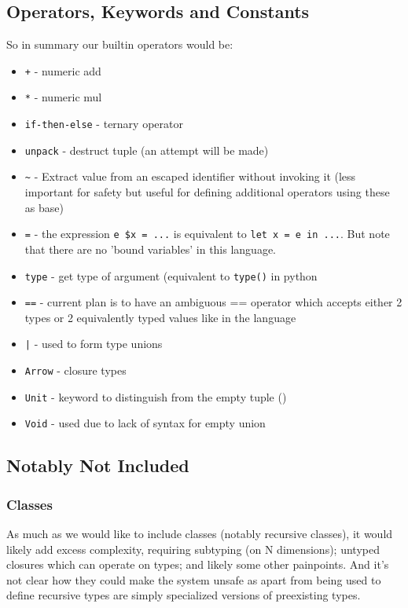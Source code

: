 \documentclass{article}
\begin{document}
\subsection{Operators, Keywords and Constants}
So in summary our builtin operators would be: 
\begin{itemize}
    \item \texttt{+} - numeric add
    \item \texttt{*} - numeric mul
    \item \texttt{if-then-else} - ternary operator
    \item \texttt{unpack} - destruct tuple (an attempt will be made)
    \item \texttt{\~} - Extract value from an escaped identifier without invoking it (less important for safety but useful for defining additional operators using these as base)
    \item \texttt{=} - the expression \texttt{e \$x = ...} is equivalent to \texttt{let x = e in ...}. But note that there are no 'bound variables' in this language.
    \item \texttt{type} - get type of argument (equivalent to \texttt{type()} in python
    \item \texttt{==} - current plan is to have an ambiguous == operator which accepts either 2 types or 2 equivalently typed values like in the language
    \item \texttt{|} - used to form type unions
    \item \texttt{Arrow} - closure types
    \item \texttt{Unit} - keyword to distinguish from the empty tuple ()
    \item \texttt{Void} - used due to lack of syntax for empty union
\end{itemize}

\subsection{Notably Not Included}

\subsubsection{Classes}
As much as we would like to include classes (notably recursive classes), it would likely add excess complexity, requiring subtyping (on N dimensions); untyped closures which can operate on types; and likely some other painpoints. And it's not clear how they could make the system unsafe as apart from being used to define recursive types are simply specialized versions of preexisting types.
\end{document}
